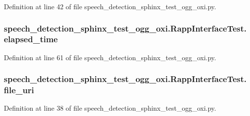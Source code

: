Definition at line 42 of file speech\-\_\-detection\-\_\-sphinx\-\_\-test\-\_\-ogg\-\_\-oxi.\-py.

\hypertarget{classspeech__detection__sphinx__test__ogg__oxi_1_1RappInterfaceTest_a209e1a0f8005f202ff747c0a2eaa681b}{
\subsubsection[{elapsed\-\_\-time}]{\setlength{\rightskip}{0pt plus 5cm}speech\-\_\-detection\-\_\-sphinx\-\_\-test\-\_\-ogg\-\_\-oxi.\-Rapp\-Interface\-Test.\-elapsed\-\_\-time}}\label{classspeech__detection__sphinx__test__ogg__oxi_1_1RappInterfaceTest_a209e1a0f8005f202ff747c0a2eaa681b}


Definition at line 61 of file speech\-\_\-detection\-\_\-sphinx\-\_\-test\-\_\-ogg\-\_\-oxi.\-py.

\hypertarget{classspeech__detection__sphinx__test__ogg__oxi_1_1RappInterfaceTest_acda5a42158b68be303759fcd4fc09fa9}{
\subsubsection[{file\-\_\-uri}]{\setlength{\rightskip}{0pt plus 5cm}speech\-\_\-detection\-\_\-sphinx\-\_\-test\-\_\-ogg\-\_\-oxi.\-Rapp\-Interface\-Test.\-file\-\_\-uri}}\label{classspeech__detection__sphinx__test__ogg__oxi_1_1RappInterfaceTest_acda5a42158b68be303759fcd4fc09fa9}


Definition at line 38 of file speech\-\_\-detection\-\_\-sphinx\-\_\-test\-\_\-ogg\-\_\-oxi.\-py.

